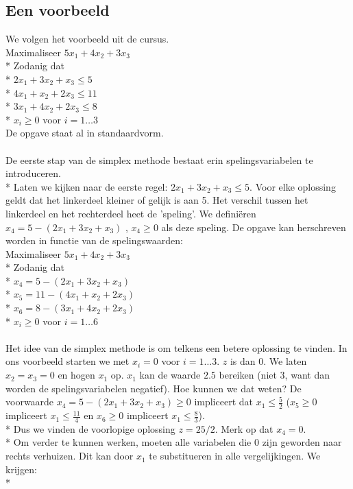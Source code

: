 \documentclass[10pt]{article}
\begin{document}
\subsection{Een voorbeeld}
We volgen het voorbeeld uit de cursus.\\
Maximaliseer $5x_1 + 4x_2 + 3x_3$\\*
Zodanig dat\\*
$2x_ 1 + 3x_ 2 + x_3 \le 5$\\*
$4x_1 + x_2 + 2x_3 \le 11$\\*
$3x_1 + 4x_2 + 2x_3 \le 8$\\*
$x_i \ge 0$ voor $i = 1\dots3$\\
De opgave staat al in standaardvorm.\\\\
De eerste stap van de simplex methode bestaat erin spelingsvariabelen te introduceren.\\*
Laten we kijken naar de eerste regel: $2x_1 + 3x_ 2 + x_3 \le 5$. Voor elke oplossing geldt dat het linkerdeel kleiner of gelijk is aan 5. Het verschil tussen het linkerdeel en het rechterdeel heet de 'speling'. We defini\"eren $x_4 = 5 - (2x_1 + 3x_ 2 + x_3)$ , $x_4 \ge 0$ als deze speling. De opgave kan herschreven worden in functie van de spelingswaarden:\\
Maximaliseer $5x_1 + 4x_2 + 3x_3$\\*
Zodanig dat\\*
$x_4 = 5 - (2x_ 1 + 3x_ 2 + x_3)$\\*
$x_5 = 11 - (4x_1 + x_2 + 2x_3)$\\*
$x_6 = 8 - (3x_1 + 4x_2 + 2x_3)$\\*
$x_i \ge 0$ voor $i = 1\dots6$\\\\
Het idee van de simplex methode is om telkens een betere oplossing te vinden. In ons voorbeeld starten we met $x_i = 0$ voor $i = 1\dots3$. $z$ is dan $0$. We laten $x_2 = x_3 = 0$ en hogen $x_1$ op. $x_1$ kan de waarde $2.5$ bereiken (niet $3$, want dan worden de spelingsvariabelen negatief). Hoe kunnen we dat weten? De voorwaarde $x_4 = 5 - (2x_1 + 3x_ 2 + x_3) \ge 0$ impliceert dat $x_1 \le \frac{5}{2}$ ($x_5 \ge 0$ impliceert $x_1 \le \frac{11}{4}$ en $x_6 \ge 0$ impliceert $x_1 \le \frac{8}{3}$).\\*
Dus we vinden de voorlopige oplossing $z = 25/2$. Merk op dat $x_4 = 0$.\\*
Om verder te kunnen werken, moeten alle variabelen die $0$ zijn geworden naar rechts verhuizen. Dit kan door $x_1$ te substitueren in alle vergelijkingen. We krijgen:\\*
\end{document}

